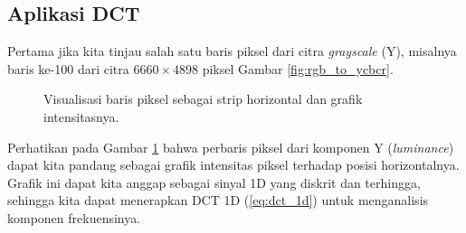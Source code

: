 \documentclass[a4paper]{article}
\begin{document}
\subsection{Aplikasi DCT}
Pertama jika kita tinjau salah satu baris piksel dari citra \textit{grayscale} (Y), misalnya baris ke-100 dari citra $6660 \times 4898$ piksel Gambar \ref{fig:rgb_to_ycbcr}.
\begin{figure}[h!]
  \centering
  \caption{Visualisasi baris piksel sebagai strip horizontal dan grafik intensitasnya.}
  \label{fig:line_pixel_visualization}
\end{figure}
Perhatikan pada Gambar \ref{fig:line_pixel_visualization} bahwa perbaris piksel dari komponen Y (\textit{luminance}) dapat kita pandang sebagai grafik intensitas piksel terhadap posisi horizontalnya. Grafik ini dapat kita anggap sebagai sinyal 1D yang diskrit dan terhingga, sehingga kita dapat menerapkan DCT 1D (\ref{eq:dct_1d}) untuk menganalisis komponen frekuensinya.
\end{document}
